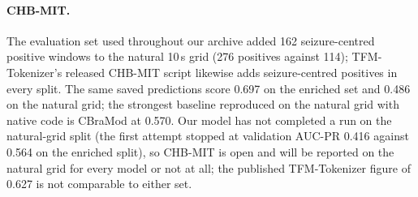 \paragraph{CHB-MIT.}
The evaluation set used throughout our archive added 162 seizure-centred positive windows to the natural 10\,s grid (276 positives against 114); TFM-Tokenizer's released CHB-MIT script likewise adds seizure-centred positives in every split. The same saved predictions score 0.697 on the enriched set and 0.486 on the natural grid; the strongest baseline reproduced on the natural grid with native code is CBraMod at 0.570. Our model has not completed a run on the natural-grid split (the first attempt stopped at validation AUC-PR 0.416 against 0.564 on the enriched split), so CHB-MIT is open and will be reported on the natural grid for every model or not at all; the published TFM-Tokenizer figure of 0.627 is not comparable to either set.
